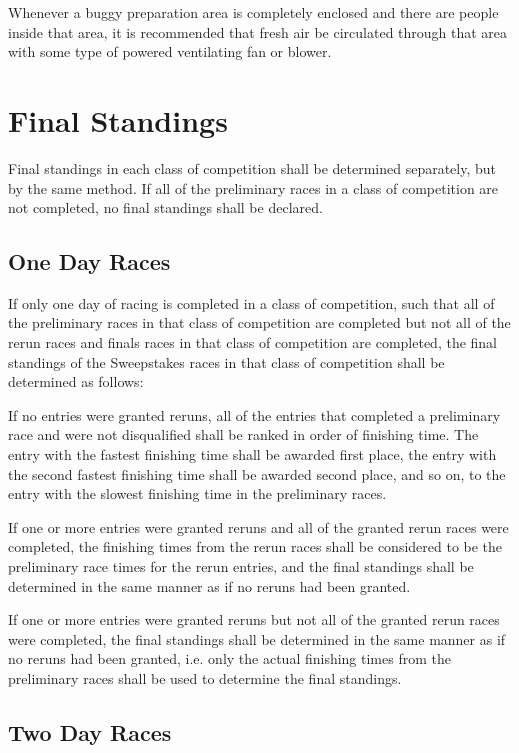 	Whenever a buggy preparation area is completely enclosed and there are people
	inside that area, it is recommended that fresh air be circulated through that
	area with some type of powered ventilating fan or blower.

\section{Final Standings}

	Final standings in each class of competition shall be determined separately,
	but by the same method. If all of the preliminary races in a class of
	competition are not completed, no final standings shall be declared.

\subsection{One Day Races}

	If only one day of racing is completed in a class of competition, such that all
	of the preliminary races in that class of competition are completed but not all
	of the rerun races and finals races in that class of competition are completed,
	the final standings of the Sweepstakes races in that class of competition shall
	be determined as follows:

	If no entries were granted reruns, all of the entries that completed a
	preliminary race and were not disqualified shall be ranked in order of
	finishing time. The entry with the fastest finishing time shall be awarded
	first place, the entry with the second fastest finishing time shall be awarded
	second place, and so on, to the entry with the slowest finishing time in the
	preliminary races.

	If one or more entries were granted reruns and all of the granted rerun races
	were completed, the finishing times from the rerun races shall be considered to
	be the preliminary race times for the rerun entries, and the final standings
	shall be determined in the same manner as if no reruns had been granted.

	If one or more entries were granted reruns but not all of the granted rerun
	races were completed, the final standings shall be determined in the same
	manner as if no reruns had been granted, i.e. only the actual finishing times
	from the preliminary races shall be used to determine the final standings.

\subsection{Two Day Races}

